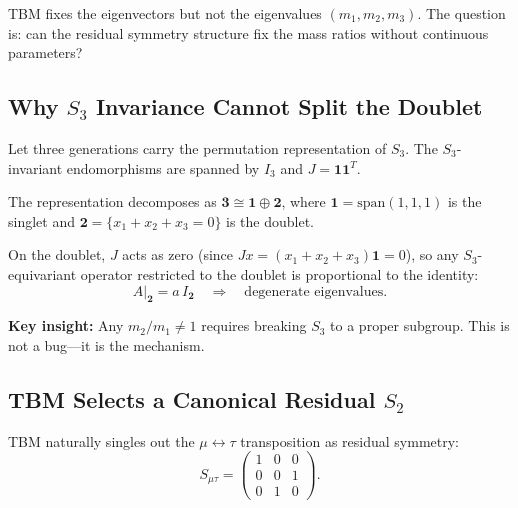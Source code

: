 TBM fixes the eigenvectors but not the eigenvalues $(m_1, m_2, m_3)$. The 
question is: can the residual symmetry structure fix the mass ratios without 
continuous parameters?

\subsection{Why $S_3$ Invariance Cannot Split the Doublet}\label{app:nu-s3}

Let three generations carry the permutation representation of $S_3$. The 
$S_3$-invariant endomorphisms are spanned by $I_3$ and $J = \mathbf{1}\mathbf{1}^T$.

The representation decomposes as $\mathbf{3} \cong \mathbf{1} \oplus \mathbf{2}$, 
where $\mathbf{1} = \mathrm{span}(1,1,1)$ is the singlet and 
$\mathbf{2} = \{x_1 + x_2 + x_3 = 0\}$ is the doublet.

On the doublet, $J$ acts as zero (since $Jx = (x_1+x_2+x_3)\mathbf{1} = 0$), so 
any $S_3$-equivariant operator restricted to the doublet is proportional to 
the identity:
\begin{equation}
A|_{\mathbf{2}} = a\,I_{\mathbf{2}} \quad \Rightarrow \quad \text{degenerate eigenvalues}.
\end{equation}

\begin{tcolorbox}[colback=yellow!5!white, colframe=yellow!60!black]
\textbf{Key insight:} Any $m_2/m_1 \neq 1$ requires breaking $S_3$ to a proper 
subgroup. This is not a bug—it is the mechanism.
\end{tcolorbox}

\subsection{TBM Selects a Canonical Residual $S_2$}\label{app:nu-s2}

TBM naturally singles out the $\mu \leftrightarrow \tau$ transposition as 
residual symmetry:
\begin{equation}
S_{\mu\tau} = \begin{pmatrix}
1 & 0 & 0 \\
0 & 0 & 1 \\
0 & 1 & 0
\end{pmatrix}.
\end{equation}

